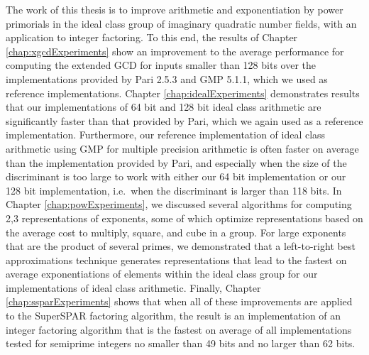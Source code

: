 \documentclass{ucalgthes1}
\theoremstyle{definition}
\newcommand{\GMP}{GMP 5.1.1}
\newcommand{\Pari}{Pari 2.5.3}
\begin{document}
The work of this thesis is to improve arithmetic and exponentiation by power primorials in the ideal class group of imaginary quadratic number fields, with an application to integer factoring.  To this end, the results of Chapter \ref{chap:xgcdExperiments} show an improvement to the average performance for computing the extended GCD for inputs smaller than 128 bits over the implementations provided by \Pari{} \cite{PariGP} and \GMP \cite{Gmp}, which we used as reference implementations.  Chapter \ref{chap:idealExperiments} demonstrates results that our implementations of 64 bit and 128 bit ideal class arithmetic are significantly faster than that provided by Pari, which we again used as a reference implementation.  Furthermore, our reference implementation of ideal class arithmetic using GMP for multiple precision arithmetic is often faster on average than the implementation provided by Pari, and especially when the size of the discriminant is too large to work with either our 64 bit implementation or our 128 bit implementation, i.e.\ when the discriminant is larger than 118 bits.  In Chapter \ref{chap:powExperiments}, we discussed several algorithms for computing 2,3 representations of exponents, some of which optimize representations based on the average cost to multiply, square, and cube in a group.  For large exponents that are the product of several primes, we demonstrated that a left-to-right best approximations technique generates representations that lead to the fastest on average exponentiations of elements within the ideal class group for our implementations of ideal class arithmetic.  Finally, Chapter \ref{chap:ssparExperiments} shows that when all of these improvements are applied to the SuperSPAR factoring algorithm, the result is an implementation of an integer factoring algorithm that is the fastest on average of all implementations tested for semiprime integers no smaller than 49 bits and no larger than 62 bits.
\end{document}
